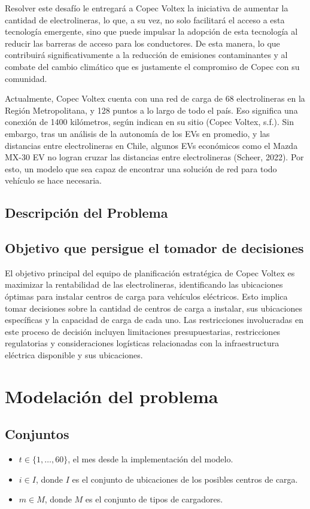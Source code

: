 \documentclass[letterpaper]{article}
\begin{document}
\begin{flushleft}
	Resolver este desafío le entregará a Copec Voltex la iniciativa de aumentar la cantidad de electrolineras, lo que, a su vez, no solo facilitará el acceso a esta tecnología emergente, sino que puede impulsar la adopción de esta tecnología al reducir las barreras de acceso para los conductores. De esta manera, lo que contribuirá significativamente a la reducción de emisiones contaminantes y al combate del cambio climático que es justamente el compromiso de Copec con su comunidad.

	Actualmente, Copec Voltex cuenta con una red de carga de 68 electrolineras en la Región Metropolitana, y 128 puntos a lo largo de todo el país. Eso significa una conexión de 1400 kilómetros, según indican en su sitio (Copec Voltex, s.f.). Sin embargo, tras un análisis de la autonomía de los EVs en promedio, y las distancias entre electrolineras en Chile, algunos EVs económicos como el Mazda MX-30 EV no logran cruzar las distancias entre electrolineras (Scheer, 2022). Por esto, un modelo que sea capaz de encontrar una solución de red para todo vehículo se hace necesaria.

	\subsection{Descripción del Problema}
	\subsection{Objetivo que persigue el tomador de decisiones}
	El objetivo principal del equipo de planificación estratégica de Copec Voltex es maximizar la rentabilidad de las electrolineras, identificando las ubicaciones óptimas para instalar centros de carga para vehículos eléctricos. Esto implica tomar decisiones sobre la cantidad de centros de carga a instalar, sus ubicaciones específicas y la capacidad de carga de cada uno. Las restricciones involucradas en este proceso de decisión incluyen limitaciones presupuestarias, restricciones regulatorias y consideraciones logísticas relacionadas con la infraestructura eléctrica disponible y sus ubicaciones.
	\section{Modelación del problema}
	\subsection{Conjuntos}
	\begin{itemize}
		\item $t \in \{1, \ldots, 60\}$, el mes desde la implementación del modelo.
		\item $i \in I$, donde $I$ es el conjunto de ubicaciones de los posibles centros de carga.
		\item $m \in M$, donde $M$ es el conjunto de tipos de cargadores.
	\end{itemize}


\end{flushleft}
\end{document}

